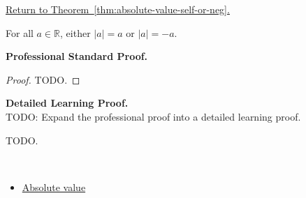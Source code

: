 \newpage
{}
\label{prf:absolute-value-self-or-neg}

\begin{remark*}[Return]
\hyperref[thm:absolute-value-self-or-neg]{Return to Theorem~\ref*{thm:absolute-value-self-or-neg}.}
\end{remark*}

\begin{theorem*}
For all $a \in \mathbb{R}$, either $\lvert a \rvert = a$ or
$\lvert a \rvert = -a$.
\end{theorem*}

\textbf{Professional Standard Proof.}~\\
\begin{proof}
TODO.
\end{proof}

\textbf{Detailed Learning Proof.}~\\
TODO: Expand the professional proof into a detailed learning proof.


\begin{remark*}
TODO.
\end{remark*}

\begin{remark*}[Dependencies]~\\
\begin{itemize}
  \item \hyperref[def:absolute-value]{Absolute value}
\end{itemize}
\end{remark*}
